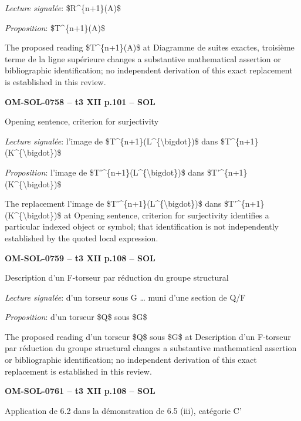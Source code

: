 \emph{Lecture signalée}: \$R\textasciicircum{}\{n+1\}(A)\$\par
\emph{Proposition}: \$T\textasciicircum{}\{n+1\}(A)\$\par
The proposed reading \$T\textasciicircum{}\{n+1\}(A)\$ at Diagramme de suites exactes, troisième terme de la ligne supérieure changes a substantive mathematical assertion or bibliographic identification; no independent derivation of this exact replacement is established in this review.\par
\par\noindent\textbf{OM-SOL-0758 -- t3 XII p.101 -- SOL}\par
Opening sentence, criterion for surjectivity\par
\emph{Lecture signalée}: l'image de \$T\textasciicircum{}\{n+1\}(L\textasciicircum{}\{\textbackslash{}bigdot\})\$ dans \$T\textasciicircum{}\{n+1\}(K\textasciicircum{}\{\textbackslash{}bigdot\})\$\par
\emph{Proposition}: l'image de \$T'\textasciicircum{}\{n+1\}(L\textasciicircum{}\{\textbackslash{}bigdot\})\$ dans \$T'\textasciicircum{}\{n+1\}(K\textasciicircum{}\{\textbackslash{}bigdot\})\$\par
The replacement l'image de \$T'\textasciicircum{}\{n+1\}(L\textasciicircum{}\{\textbackslash{}bigdot\})\$ dans \$T'\textasciicircum{}\{n+1\}(K\textasciicircum{}\{\textbackslash{}bigdot\})\$ at Opening sentence, criterion for surjectivity identifies a particular indexed object or symbol; that identification is not independently established by the quoted local expression.\par
\par\noindent\textbf{OM-SOL-0759 -- t3 XII p.108 -- SOL}\par
Description d'un F-torseur par réduction du groupe structural\par
\emph{Lecture signalée}: d'un torseur sous G … muni d'une section de Q/F\par
\emph{Proposition}: d'un torseur \$Q\$ sous \$G\$\par
The proposed reading d'un torseur \$Q\$ sous \$G\$ at Description d'un F-torseur par réduction du groupe structural changes a substantive mathematical assertion or bibliographic identification; no independent derivation of this exact replacement is established in this review.\par
\par\noindent\textbf{OM-SOL-0761 -- t3 XII p.108 -- SOL}\par
Application de 6.2 dans la démonstration de 6.5 (iii), catégorie C'\par
